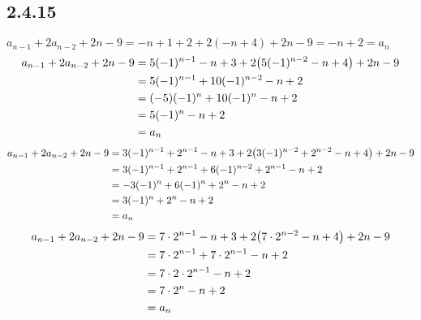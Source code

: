 \documentclass[12pt,titlepage]{extarticle}
\begin{document}
\subsection*{2.4.15}
\begin{tasks}
    \task $a_{n-1} + 2a_{n-2} + 2n - 9 = -n + 1 + 2 + 2(-n + 4) + 2n - 9 = -n + 2 = a_n$
    \task \begin{align*}
        a_{n-1} + 2a_{n-2} + 2n - 9 &= 5(-1)^{n-1} - n + 3 + 2 \qty(5(-1)^{n-2} - n + 4) + 2n - 9 \\
                                    &= 5(-1)^{n-1} + 10(-1)^{n-2} - n + 2 \\
                                    &= (-5)(-1)^{n} + 10(-1)^{n} - n + 2 \\
                                    &= 5(-1)^n - n + 2 \\
                                    &= a_n
    \end{align*}
    \task \begin{align*}
        a_{n-1} + 2a_{n-2} + 2n - 9 &= 3(-1)^{n-1} + 2^{n-1} - n + 3 + 2\qty(3(-1)^{n-2} + 2^{n-2} - n + 4) + 2n - 9 \\
                                    &= 3(-1)^{n-1} + 2^{n-1} + 6(-1)^{n-2} + 2^{n-1}  - n + 2 \\
                                    &= -3(-1)^{n} + 6(-1)^{n} + 2^n - n + 2 \\
                                    &= 3(-1)^n + 2^n - n + 2 \\
                                    &= a_n
    \end{align*}
    \task \begin{align*}
        a_{n-1} + 2a_{n-2} + 2n - 9 &= 7\cdot 2^{n-1} - n + 3 + 2\qty(7 \cdot 2^{n-2} - n + 4) + 2n - 9 \\
                                    &= 7 \cdot 2^{n-1} + 7 \cdot 2^{n-1} - n + 2 \\
                                    &= 7 \cdot 2 \cdot 2^{n-1} - n + 2 \\
                                    &= 7 \cdot 2^n - n + 2 \\
                                    &= a_n
    \end{align*}
\end{tasks}
\end{document}
